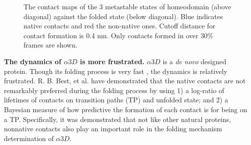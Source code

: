 \documentclass[12pt]{article}
\begin{document}
\begin{figure}[htbp]
  \centering
  \caption{\label{UVF}The contact maps of the 3 metastable states of homeodomain (above diagonal) against the folded state (below diagonal). Blue indicates native contacts and red the non-native ones. Cutoff distance for contact formation is 0.4 nm. Only contacts formed in over $30\%$ frames are shown.}
\end{figure}

\setlength{\parindent}{0em}

{\bf The dynamics of $\alpha 3D$ is more frustrated.} $\alpha 3D$ is a {\it de novo} designed protein\cite{A3D_de_novo}. Though its folding process is very fast \cite{A3D_fast_folder}, the dynamics is relatively frustrated. R. B. Best, et al. have demonstrated that the native contacts are not remarkably preferred during the folding process\cite{frustration} by using 1) a log-ratio of lifetimes of contacts on transition paths (TP) and unfolded state; and 2) a Bayesian measure of how predictive the formation of each contact is for being on a TP. Specifically, it was demonstrated that not like other natural proteins, nonnative contacts also play an important role in the folding mechanism determination of $\alpha 3D$\cite{A3D_frustration}.
\end{document}
